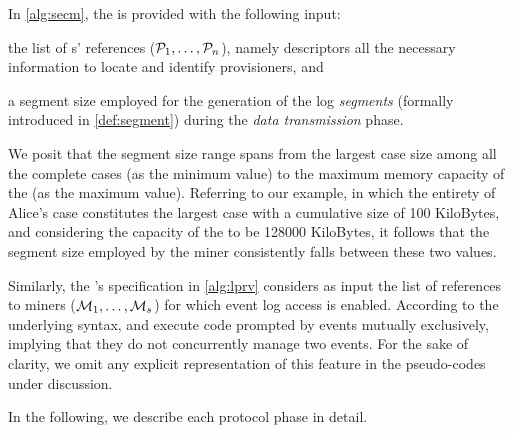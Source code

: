 \begin{newj}
In \cref{alg:secm}, the  is provided with the following input:
\begin{inparadesc}
    \item the list of s' references ($\mathcal{P}_1, \ldots, \mathcal{P}_n$), namely descriptors all the necessary information to locate and identify provisioners, and 
    \item a segment size {\SegSize} employed for the generation of the log \emph{segments} (formally introduced in \cref{def:segment}) during the \textit{data transmission} phase. %
\end{inparadesc}
We posit that the segment size range spans from the largest case size among all the complete cases (as the minimum value) to the maximum memory capacity of the  (as the maximum value). Referring to our example, in which the entirety of Alice's case constitutes the largest case with a cumulative size of 100 KiloBytes, and considering the capacity of the  to be 128000 KiloBytes, it follows that the segment size employed by the miner consistently falls between these two values.

Similarly, the 's specification in \cref{alg:lprv} considers as input the list of references to miners ($\mathcal{M}_1, \ldots, \mathcal{M}_s$) for which event log access is enabled. According to the underlying syntax, {\SecM} and {\LPrv} execute code prompted by events mutually exclusively, implying that they do not concurrently manage two events. For the sake of clarity, we omit any explicit representation of this feature in the pseudo-codes under discussion.
\end{newj}

In the following, we describe each protocol phase in detail.

